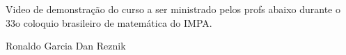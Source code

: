 Video de demonstração do curso a ser ministrado pelos profs abaixo durante o 33o coloquio brasileiro de matemática do IMPA.

Ronaldo Garcia
Dan Reznik